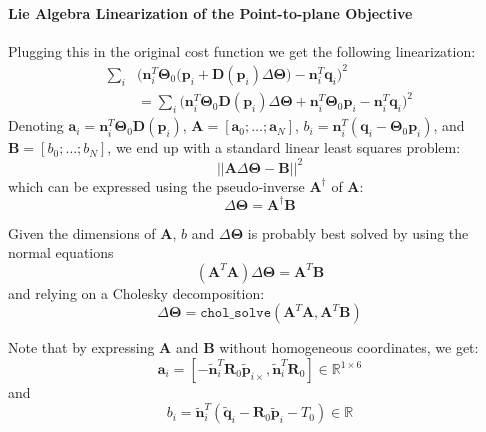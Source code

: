\paragraph{Lie Algebra Linearization of the Point-to-plane Objective}
Plugging this in the original cost function we get the following linearization:
\begin{equation}
\begin{split}
\sum_i & \Big(\mathbf{n}_i^T \mathbf{\Theta}_0 \big(\mathbf{p}_i + \mathbf{D}(\mathbf{p}_i)\Delta\mathbf{\Theta} \big) - \mathbf{n}_i^T \mathbf{q}_i\Big)^2
\\
&= \sum_i \Big(\mathbf{n}_i^T \mathbf{\Theta}_0 \mathbf{D}(\mathbf{p}_i)\Delta\mathbf{\Theta} + \mathbf{n}_i^T \mathbf{\Theta}_0 \mathbf{p}_i - \mathbf{n}_i^T \mathbf{q}_i\Big)^2
\end{split}
\end{equation}
Denoting $\mathbf{a}_i = \mathbf{n}_i^T \mathbf{\Theta}_0 \mathbf{D}(\mathbf{p}_i)$, $\mathbf{A}=[\mathbf{a}_0;\ldots;\mathbf{a}_N]$,
$b_i = \mathbf{n}_i^T (\mathbf{q}_i - \mathbf{\Theta}_0 \mathbf{p}_i)$, and $\mathbf{B}=[b_0;\ldots;b_N]$, we end up with a standard linear least squares problem:
\begin{equation}
||\mathbf{A} \Delta\mathbf{\Theta} - \mathbf{B}||^2
\end{equation}
which can be expressed using the pseudo-inverse $\mathbf{A}^{\dagger}$ of $\mathbf{A}$:
\begin{equation}
\Delta\mathbf{\Theta} = \mathbf{A}^{\dagger} \mathbf{B}
\end{equation}

Given the dimensions of $\mathbf{A}$, $b$ and $\Delta\mathbf{\Theta}$ is probably best solved by using the normal equations
\begin{equation}
(\mathbf{A}^T \mathbf{A}) \Delta\mathbf{\Theta} = \mathbf{A}^T \mathbf{B}
\end{equation}
and relying on a Cholesky decomposition:
\begin{equation}
\Delta\mathbf{\Theta} = \texttt{chol\_solve}(\mathbf{A}^T \mathbf{A}, \mathbf{A}^T \mathbf{B})
\end{equation}

Note that by expressing $\mathbf{A}$ and $\mathbf{B}$ without homogeneous coordinates, we get:
\begin{equation}
\mathbf{a}_i = [-\tilde{\mathbf{n}}_i^T \mathbf{R}_0 {{\tilde{\mathbf{p}}}_{i\times}}, \tilde{\mathbf{n}}_i^T \mathbf{R}_0] \in \mathbb{R}^{1\times6}
\end{equation}
and
\begin{equation}
b_i = \tilde{\mathbf{n}}_i^T (\tilde{\mathbf{q}}_i - \mathbf{R}_0 \tilde{\mathbf{p}}_i - T_0) \in \mathbb{R}
\end{equation}

